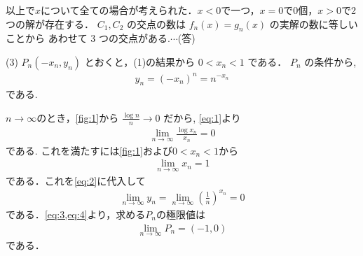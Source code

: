 \documentclass[a4paper,10pt]{ltjsarticle}
\begin{document}
\begin{multicols}{2}
  以上で$x$について全ての場合が考えられた．$x<0$で一つ，$x=0$で0個，$x>0$で2つの解が存在する．
  $C_1, C_2$ の交点の数は $f_n(x) = g_n(x)$ の実解の数に等しいことから
  あわせて $3$ つの交点がある.$\cdots$(答)

  \vspace{10pt}
  (3) $P_n(-x_n, y_n)$ とおくと，(1)の結果から $0 < x_n < 1$ である．
  $P_n$ の条件から,
  \begin{align}
    y_n = (-x_n)^n = n^{-x_n} \label{eq:2}
  \end{align}
  である.

  $n\to\infty$のとき，\cref{fig:1}から $\frac{\log n}{n} \to 0$ だから,
  \cref{eq:1}より
  \begin{align*}
    \lim_{n\to\infty} \frac{\log x_n}{x_n} = 0
  \end{align*}
  である. これを満たすには\cref{fig:1}および$0<x_n<1$から
  \begin{align}
    \lim_{n\to\infty} x_n = 1 \label{eq:3}
  \end{align}
  である．これを\cref{eq:2}に代入して
  \begin{align}
    \lim_{n\to\infty} y_n = \lim_{n\to\infty} \left(\frac{1}{n}\right)^{x_n} = 0 \label{eq:4}
  \end{align}
  である．\cref{eq:3,eq:4}より，求める$P_n$の極限値は
  \begin{align*}
    \lim_{n\to\infty}P_n = (-1,0)
  \end{align*}
  である．

  \newpage
\end{multicols}
\end{document}
